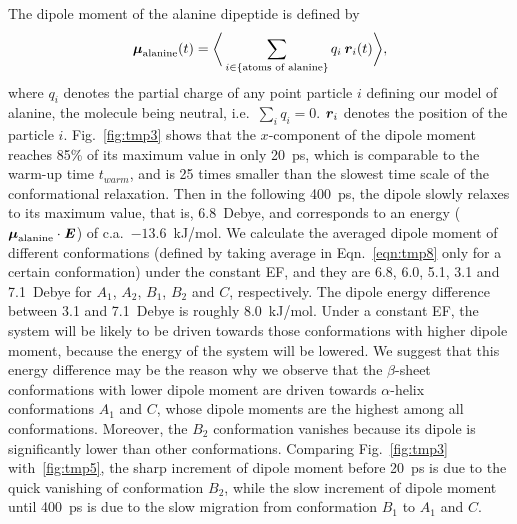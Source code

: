 \documentclass[a4paper,preprint,unsortedaddress,onecolumn]{revtex4-1}
\newcommand{\vect}[1]{\textbf{\textit{#1}}}
\begin{document}
The dipole moment of the alanine dipeptide is defined by
\begin{align}\label{eqn:tmp8}
  \boldsymbol\mu_{\textrm{alanine}}(t) =
  \bigg\langle
  \sum_{i\in \{\textrm{atoms of alanine}\}}
  q_i\, \vect r_i(t)
  \bigg\rangle,
\end{align}
where $q_i$ denotes the partial charge of any point particle $i$ defining our model of alanine,
the molecule being neutral, i.e.~$\sum_iq_i = 0$.
$\vect r_i$ denotes the position of the particle $i$.
Fig.~\ref{fig:tmp3}
shows that the $x$-component of the dipole moment 
reaches 85\% of its maximum value in only 20~ps, which is comparable to
the warm-up time $t_{warm}$, and is 25 times
smaller than the slowest time scale of the conformational relaxation.
Then in the following 400~ps, the dipole slowly relaxes to its 
maximum value, that is, 
6.8~Debye, and  corresponds to an energy
($\boldsymbol\mu_{\textrm{alanine}} \cdot \vect E$)
of c.a.~$-13.6$~kJ/mol.
We calculate the averaged dipole moment of different conformations
(defined by taking average in Eqn.~\eqref{eqn:tmp8}
only for a certain conformation)
under the constant EF, and they are 6.8, 6.0, 5.1, 3.1 and 7.1~Debye
for $A_1$, $A_2$, $B_1$, $B_2$ and $C$, respectively.
The dipole energy difference between 3.1 and 7.1~Debye is roughly 8.0~kJ/mol.
Under a constant EF, the system will be likely to be driven towards those
conformations with higher dipole moment, because the
energy of the system will be lowered.  We suggest that this energy difference may be the reason why
we observe that the $\beta$-sheet conformations with lower dipole moment
are driven towards $\alpha$-helix conformations
$A_1$ and $C$, whose dipole moments are the highest
among all conformations. Moreover, the $B_2$ conformation vanishes because
its dipole is significantly lower than other conformations.
Comparing Fig.~\ref{fig:tmp3} with~\ref{fig:tmp5},
  the sharp increment of dipole moment before 20~ps is due to the quick vanishing of conformation
  $B_2$, while the slow increment of dipole moment until 400~ps is due to
  the slow migration from conformation $B_1$ to $A_1$ and $C$.
\end{document}
